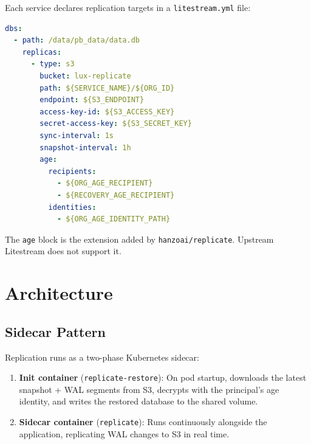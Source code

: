 \documentclass[11pt,a4paper]{article}
\begin{document}
Each service declares replication targets in a \texttt{litestream.yml}
file:

\begin{lstlisting}[language=YAML,caption={Minimal litestream.yml for a Base service.}]
dbs:
  - path: /data/pb_data/data.db
    replicas:
      - type: s3
        bucket: lux-replicate
        path: ${SERVICE_NAME}/${ORG_ID}
        endpoint: ${S3_ENDPOINT}
        access-key-id: ${S3_ACCESS_KEY}
        secret-access-key: ${S3_SECRET_KEY}
        sync-interval: 1s
        snapshot-interval: 1h
        age:
          recipients:
            - ${ORG_AGE_RECIPIENT}
            - ${RECOVERY_AGE_RECIPIENT}
          identities:
            - ${ORG_AGE_IDENTITY_PATH}
\end{lstlisting}

The \texttt{age} block is the extension added by
\texttt{hanzoai/replicate}. Upstream Litestream does not support it.

\section{Architecture}\label{sec:arch}

\subsection{Sidecar Pattern}\label{sec:sidecar}

Replication runs as a two-phase Kubernetes sidecar:

\begin{enumerate}[nosep]
  \item \textbf{Init container} (\texttt{replicate-restore}): On pod
    startup, downloads the latest snapshot + WAL segments from S3,
    decrypts with the principal's age identity, and writes the
    restored database to the shared volume.
  \item \textbf{Sidecar container} (\texttt{replicate}): Runs
    continuously alongside the application, replicating WAL changes
    to S3 in real time.
\end{enumerate}
\end{document}
